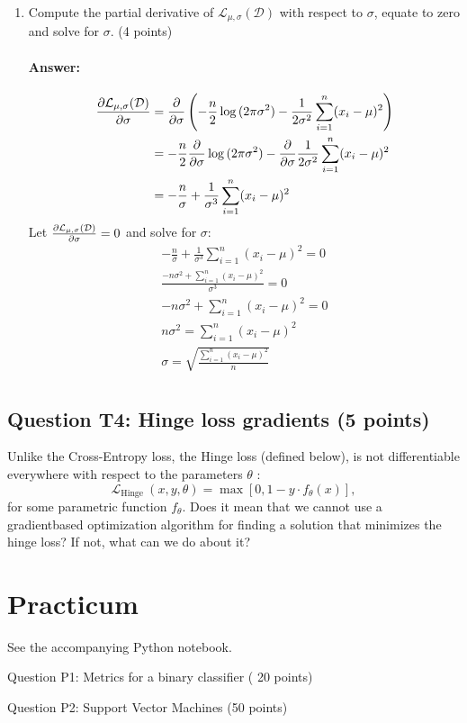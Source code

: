 \documentclass[10pt]{article}
\begin{document}
\begin{enumerate}
  \item Compute the partial derivative of $\mathcal{L}_{\mu, \sigma}(\mathcal{D})$ with respect to $\sigma$, equate to zero and solve for $\sigma$. (4 points)
  \paragraph{Answer:}
  \begin{align*}
    \pdv{\mathcal{L}_{\mu, \sigma}(\mathcal{D})}{\sigma } &= \pdv{}{\sigma} \left(-\frac{n}{2}\log{(2\pi \sigma^2)}-\frac{1}{2\sigma^2}\sum_{i=1}^n (x_i-\mu )^{2}\right)\\
    &= -\frac{n}{2}\pdv{}{\sigma}\log{(2\pi \sigma^2)}-\pdv{}{\sigma}\frac{1}{2\sigma^2}\sum_{i=1}^n (x_i-\mu )^{2}\\
     &= -\frac{n}{\sigma} + \frac{1}{\sigma^3}\sum_{i=1}^n (x_i-\mu )^{2}
  \end{align*}
  Let $\pdv{\mathcal{L}_{\mu, \sigma}(\mathcal{D})}{\sigma}=0$ and solve for $\sigma$:
  \begin{align*}
    -\frac{n}{\sigma} + \frac{1}{\sigma^3}\sum_{i=1}^n (x_i-\mu )^{2} = 0\\
    \frac{-n\sigma^2 + \sum_{i=1}^n (x_i-\mu )^{2}}{\sigma^3} = 0\\
    -n\sigma^2 + \sum_{i=1}^n (x_i-\mu )^{2} = 0\\
    n\sigma^2 = \sum_{i=1}^n (x_i-\mu )^{2}\\
    \sigma = \sqrt{\frac{\sum_{i=1}^n (x_i-\mu )^{2}}{n}}\\
  \end{align*}
\end{enumerate}
\subsection*{Question T4: Hinge loss gradients (5 points)}
Unlike the Cross-Entropy loss, the Hinge loss (defined below), is not differentiable everywhere with respect to the parameters $\theta$ :
$$
\mathcal{L}_{\text {Hinge }}(x, y, \theta)=\max \left[0,1-y \cdot f_{\theta}(x)\right],
$$
for some parametric function $f_{\theta}$. Does it mean that we cannot use a gradientbased optimization algorithm for finding a solution that minimizes the hinge loss? If not, what can we do about it?

\section*{Practicum}
See the accompanying Python notebook.

Question P1: Metrics for a binary classifier ( 20 points)

Question P2: Support Vector Machines (50 points)
\end{document}
